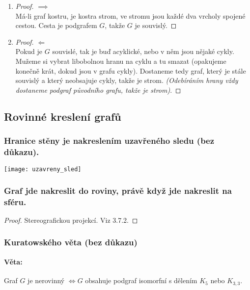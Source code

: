 \documentclass[10pt,a4paper]{article}
\begin{document}
\begin{enumerate}
    \item \begin{proof} $\implies$\\
        Má-li graf kostru, je kostra strom, ve stromu jsou každé dva vrcholy spojené cestou. Cesta je podgrafem $G$, takže $G$ je souvislý.
        \end{proof}
    \item \begin{proof} $\Longleftarrow$\\
        Pokud je $G$ souvislé, tak je buď acyklické, nebo v něm jsou nějaké cykly. Mužeme si vybrat libobolnou hranu na cyklu a tu smazat (opakujeme konečně krát, dokud jsou v grafu cykly). Dostaneme tedy graf, který je stále souvislý a který neobsajuje cykly, takže je strom. \textit{(Odebíráním hrany vždy dostaneme podgraf původního grafu, takže je strom)}.
        \end{proof}
\end{enumerate}

\subsection{Rovinné kreslení grafů}

\subsubsection{Hranice stěny je nakreslením uzavřeného sledu (bez důkazu).}
\begin{center}
    \texttt{[image: uzavreny\_sled]}
\end{center}

\subsubsection{Graf jde nakreslit do roviny, právě když jde nakreslit na sféru.}
\begin{proof}
    Stereografickou projekcí. Viz 3.7.2.
\end{proof}

\subsubsection{Kuratowského věta (bez důkazu)}

\paragraph*{Věta: } Graf $G$ je nerovinný $\iff G$ obsahuje podgraf isomorfní s dělením $K_5$ nebo $K_{3,3}$.
\end{document}
